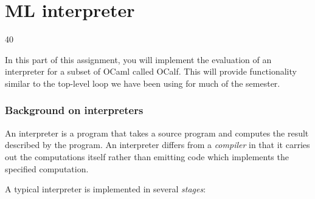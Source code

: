 \documentclass{pset}
\begin{document}

\newpage{}
\part{ML interpreter}{40}
\label{part:eval}

In this part of this assignment, you will implement the evaluation of an
interpreter for a subset of OCaml called OCalf. This will provide
functionality similar to the top-level loop we have been using for much
of the semester.

\section*{Background on interpreters}

An interpreter is a program that takes a source program and computes
the result described by the program. An interpreter differs from a
\emph{compiler} in that it carries out the computations itself rather
than emitting code which implements the specified computation.

\medskip

A typical interpreter is implemented in several \emph{stages}:
\end{document}
